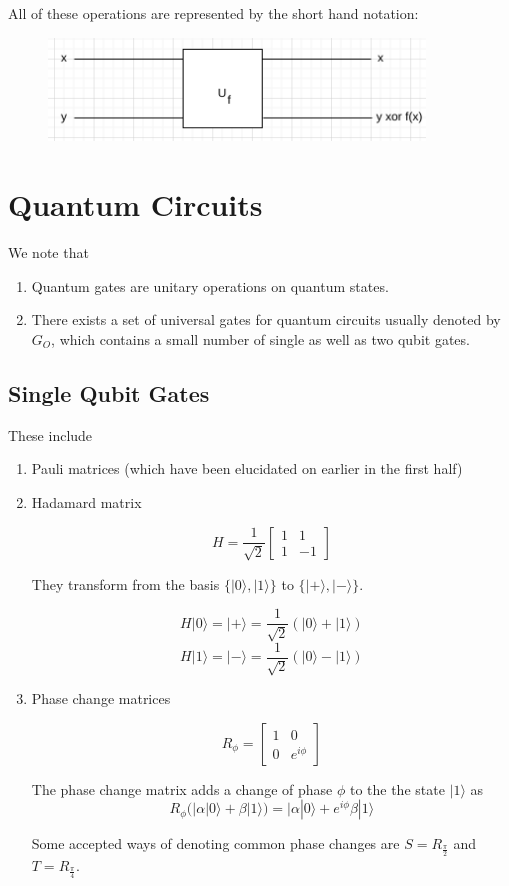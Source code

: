 \documentclass{article}
\begin{document}
All of these operations are represented by the short hand notation:

\begin{figure}[htp]
    \centering
    \includegraphics[width=10cm]{uncomputation.png}
\end{figure}

\section {Quantum Circuits}

We note that
\begin{enumerate}
    \item Quantum gates are unitary operations on quantum states.
    \item There exists a set of universal gates for quantum circuits usually denoted by $G_O$, which contains a small number of single as well as two qubit gates.
\end{enumerate}

\subsection{Single Qubit Gates}

These include 

\begin{enumerate}
    \item Pauli matrices (which have been elucidated on earlier in the first half)
    \item Hadamard matrix

    $$H = \frac{1}{\sqrt{2}} \begin{bmatrix}
            1 & 1\\
            1 & -1
    \end{bmatrix}$$

    They transform from the basis $\{|0\rangle, |1\rangle\}$ to $\{|+\rangle, |-\rangle\}$.

    $$H|0\rangle = |+\rangle = \frac{1}{\sqrt{2}}(|0\rangle + |1\rangle)$$    
    $$H|1\rangle = |-\rangle = \frac{1}{\sqrt{2}}(|0\rangle - |1\rangle)$$    
    
    \item Phase change matrices

    $$R_{\phi} = \begin{bmatrix}
            1 & 0\\
            0 & e^{i\phi}    
    \end{bmatrix}$$

    The phase change matrix adds a change of phase $\phi$ to the the state $|1\rangle$ as $$R_{\phi}(|\alpha |0\rangle + \beta |1\rangle) = |\alpha |0\rangle + e^{i\phi}\beta |1\rangle$$

    Some accepted ways of denoting common phase changes are $S=R_{\frac{\pi}{2}}$ and $T=R_{\frac{\pi}{4}}$.
    
\end{enumerate}
\end{document}
